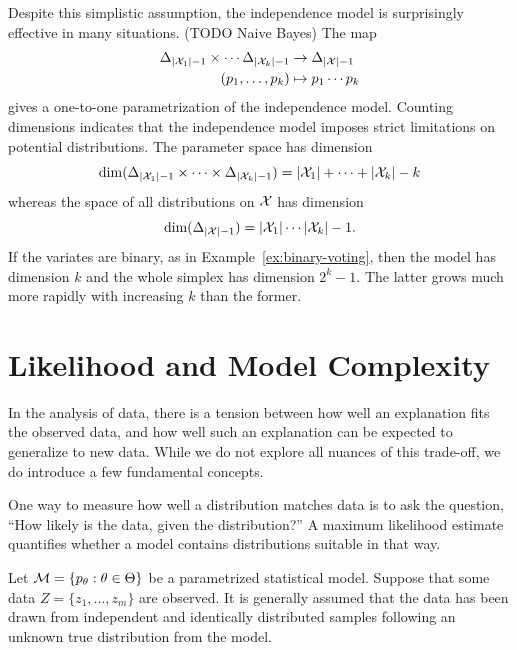 \documentclass[cclicense]{hmcthesis}
\numberwithin{equation}{chapter}
\numberwithin{ucounter}{chapter}
\begin{document}
    Despite this simplistic assumption, the independence model is surprisingly
    effective in many situations.  (TODO Naive Bayes)
    The map 
    \begin{align*}
        \Delta_{|\mathcal{X}_1|-1} \times \cdots \Delta_{|\mathcal{X}_k|-1} 
        &\to \Delta_{|\mathcal{X}| - 1} \\
        (p_1, \ldots, p_k) &\mapsto p_1 \cdots p_k
    \end{align*}
    gives a one-to-one parametrization of the independence model.  Counting
    dimensions indicates that the independence model imposes strict limitations
    on potential distributions.  The parameter space has dimension
    \[
        \dim 
        (\Delta_{|\mathcal{X}_1|-1} \times \cdots \times \Delta_{|\mathcal{X}_k|-1})
        =
        |\mathcal{X}_1| + \cdots + |\mathcal{X}_k| - k
    \]
    whereas the space of all distributions on $\mathcal{X}$ has dimension 
    \[
        \dim(\Delta_{|\mathcal{X}| - 1})
        =
        |\mathcal{X}_1| \cdots |\mathcal{X}_k| - 1.
    \]
    If the variates are binary, as in Example~\ref{ex:binary-voting}, then the
    model has dimension $k$ and the whole simplex has dimension $2^k - 1$.
    The latter grows much more rapidly with increasing $k$ than the former.
    
\section{Likelihood and Model Complexity}
    In the analysis of data, there is a tension between how well an explanation
    fits the observed data, and how well such an explanation can be expected to
    generalize to new data.  While we do not explore all nuances of this
    trade-off, we do introduce a few fundamental concepts.

    One way to measure how well a distribution matches data is to ask the
    question, ``How likely is the data, given the distribution?''  A maximum
    likelihood estimate quantifies whether a model contains distributions
    suitable in that way.

    Let $\mathcal{M} = \{p_\theta : \theta \in \Theta\}$ be a parametrized statistical
    model.  Suppose that some data $Z = \{z_1, \ldots, z_m\}$ are observed.  It
    is generally assumed that the data has been drawn from independent and
    identically distributed samples following an unknown true distribution from
    the model.
    
\end{document}
